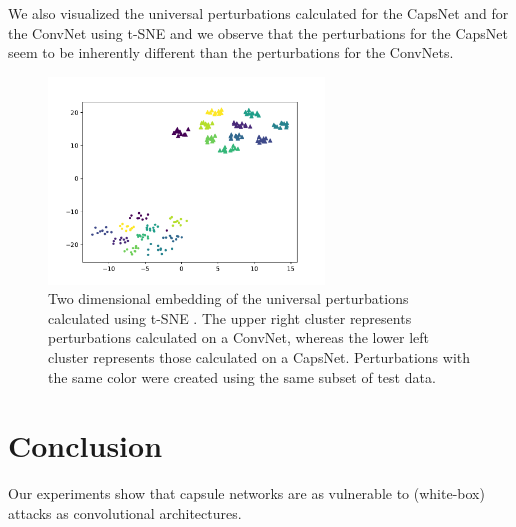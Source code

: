 \documentclass{article}
\begin{document}
We also visualized the universal perturbations calculated for the CapsNet and for the ConvNet using t-SNE \cite{tsne} and we observe that the perturbations for the CapsNet seem to be inherently different than the perturbations for the ConvNets.
\begin{figure}
	\centering
	\includegraphics[height=5.5cm]{figures/tsne.pdf}
	\caption{Two dimensional embedding of the universal perturbations calculated using t-SNE \cite{tsne}. The upper right cluster represents perturbations calculated on a ConvNet, whereas the lower left cluster represents those calculated on a CapsNet. Perturbations with the same color were created using the same subset of test data.}
\end{figure}


\FloatBarrier
\section{Conclusion}
Our experiments show that capsule networks are as vulnerable to (white-box) attacks as convolutional architectures.



\end{document}
